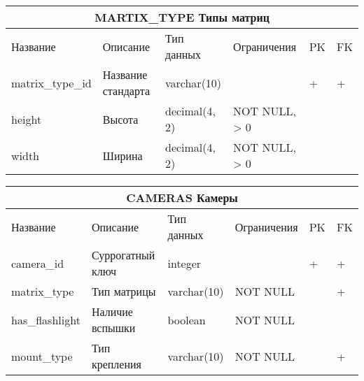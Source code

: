 \documentclass{article}
\begin{document}
\begin{tabular}{ |p{4cm}|p{4cm}|p{2.5cm}|p{3.5cm}|p{2cm}|p{1cm}| }
\hline
\multicolumn{6}{|c|}{MARTIX\_TYPE Типы матриц} \\
\hline
Название & Описание & Тип данных & Ограничения & PK & FK\\
\hline
matrix\_type\_id                    &   %
Название стандарта                  &   %
varchar(10)                         &   %
                                    &   %
 +                                  &   %
 +                                  \\  %
\hline
height                              &   %
Высота                              &   %
decimal(4, 2)                       &   %
NOT NULL, \linebreak
> 0                                 &   %
                                    &   %
                                    \\  %
\hline
width                               &   %
Ширина                              &   %
decimal(4, 2)                       &   %
NOT NULL, \linebreak
> 0                                 &   %
                                    &   %
                                    \\  %
\hline
\end{tabular}

\begin{tabular}{ |p{4cm}|p{4cm}|p{2.5cm}|p{3.5cm}|p{2cm}|p{1cm}| }
\hline
\multicolumn{6}{|c|}{CAMERAS Камеры} \\
\hline
Название & Описание & Тип данных & Ограничения & PK & FK\\
\hline
camera\_id                          &   %
Суррогатный ключ                    &   %
integer                             &   %
                                    &   %
 +                                  &   %
 +                                  \\  %
\hline
matrix\_type                        &   %
Тип матрицы                         &   %
varchar(10)                         &   %
NOT NULL                            &   %
                                    &   %
 +                                  \\  %
\hline
has\_flashlight                     &   %
Наличие вспышки                     &   %
boolean                             &   %
NOT NULL                            &   %
                                    &   %
                                    \\  %
\hline
mount\_type                         &   %
Тип крепления                       &   %
varchar(10)                         &   %
NOT NULL                            &   %
                                    &   %
 +                                  \\  %
\hline
\end{tabular}
\end{document}
